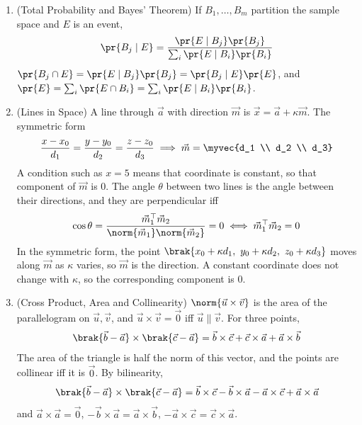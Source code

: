 \begin{enumerate}[label=\thesubsection.\arabic*, ref=\thesubsection.\theenumi,itemsep=1.5em]
\item (Total Probability and Bayes' Theorem) If $B_1,\dots,B_m$ partition the sample space and $E$ is an event,
\begin{align}
\pr{B_j\mid E} = \frac{\pr{E\mid B_j}\pr{B_j}}{\sum_{i}\pr{E\mid B_i}\pr{B_i}}
\label{eq:EE26BTECH11218-cb12-bayes}
\end{align}
\solution $\pr{B_j\cap E} = \pr{E\mid B_j}\pr{B_j} = \pr{B_j\mid E}\pr{E}$, and $\pr{E}=\sum_i\pr{E\cap B_i} = \sum_i\pr{E\mid B_i}\pr{B_i}$.

\item (Lines in Space) A line through $\vec{a}$ with direction $\vec{m}$ is $\vec{x}=\vec{a}+\kappa\vec{m}$. The symmetric form
\begin{align}
\frac{x-x_0}{d_1} = \frac{y-y_0}{d_2} = \frac{z-z_0}{d_3} \implies \vec{m} = \myvec{d_1 \\ d_2 \\ d_3}
\label{eq:EE26BTECH11218-cb12-symm}
\end{align}
A condition such as $x=5$ means that coordinate is constant, so that component of $\vec{m}$ is $0$. The angle $\theta$ between two lines is the angle between their directions, and they are perpendicular iff
\begin{align}
\cos\theta = \frac{\vec{m}_1^{\top}\vec{m}_2}{\norm{\vec{m}_1}\norm{\vec{m}_2}} = 0 \iff \vec{m}_1^{\top}\vec{m}_2 = 0
\label{eq:EE26BTECH11218-cb12-perp}
\end{align}
\solution In the symmetric form, the point $\brak{x_0+\kappa d_1,\ y_0+\kappa d_2,\ z_0+\kappa d_3}$ moves along $\vec{m}$ as $\kappa$ varies, so $\vec{m}$ is the direction. A constant coordinate does not change with $\kappa$, so the corresponding component is $0$.

\item (Cross Product, Area and Collinearity) $\norm{\vec{u}\times\vec{v}}$ is the area of the parallelogram on $\vec{u},\vec{v}$, and $\vec{u}\times\vec{v}=\vec{0}$ iff $\vec{u}\parallel\vec{v}$. For three points,
\begin{align}
\brak{\vec{b}-\vec{a}}\times\brak{\vec{c}-\vec{a}} = \vec{b}\times\vec{c}+\vec{c}\times\vec{a}+\vec{a}\times\vec{b}
\label{eq:EE26BTECH11218-cb12-cross}
\end{align}
The area of the triangle is half the norm of this vector, and the points are collinear iff it is $\vec{0}$.
\solution By bilinearity,
\begin{align}
\brak{\vec{b}-\vec{a}}\times\brak{\vec{c}-\vec{a}} = \vec{b}\times\vec{c} - \vec{b}\times\vec{a} - \vec{a}\times\vec{c} + \vec{a}\times\vec{a}
\end{align}
and $\vec{a}\times\vec{a}=\vec{0}$, $-\vec{b}\times\vec{a}=\vec{a}\times\vec{b}$, $-\vec{a}\times\vec{c}=\vec{c}\times\vec{a}$.


\end{enumerate}

